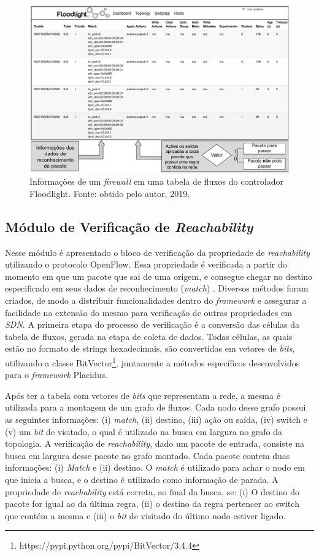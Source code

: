 \documentclass[12pt]{article}
\begin{document}
\begin{figure}[h!]
\centering\includegraphics[width=\columnwidth]{Resources/InfosFloodlight.pdf}
\caption{Informações de um \textit{firewall} em uma tabela de fluxos do controlador Floodlight. Fonte: obtido pelo autor, 2019.}
\label{fig:infosFloodlight}
\end{figure}

\subsection{Módulo de Verificação de \textit{Reachability}} 
Nesse módulo é apresentado o bloco de verificação da propriedade de \textit{reachability} utilizando o protocolo OpenFlow.
Essa propriedade é verificada a partir do momento em que um pacote que sai de uma origem, e consegue chegar no destino especificado em seus dados de reconhecimento (\textit{match})  \cite{1498492}.
Diversos métodos foram criados, de modo a distribuir funcionalidades dentro do \textit{framework} e assegurar a facilidade na extensão do mesmo para verificação de outras propriedades em \textit{SDN}.
A primeira etapa do processo de verificação é a conversão das células da tabela de fluxos, gerada na etapa de coleta de dados. Todas células, as quais estão no formato de strings hexadecimais, são convertidas em vetores de \textit{bits}, utilizando a classe BitVector\footnote{https://pypi.python.org/pypi/BitVector/3.4.4}, juntamente a métodos específicos desenvolvidos para o \textit{framework} Placidus. 

Após ter a tabela com vetores de \textit{bits} que representam a rede, a mesma é utilizada para a montagem de um grafo de fluxos. Cada nodo desse grafo possui as seguintes informações: (i) \textit{match}, (ii) destino, (iii) ação ou saída, (iv) switch e (v) um \textit{bit} de visitado, o qual é utilizado na busca em largura no grafo da topologia. 
A verificação de \textit{reachability}, dado um pacote de entrada, consiste na busca em largura desse pacote no grafo montado.
Cada pacote contem duas informações: (i) \textit{Match} e (ii) destino. 
O \textit{match} é utilizado para achar o nodo em que inicia a busca, e o destino é utilizado como informação de parada. 
A propriedade de \textit{reachability} está correta, ao final da busca, se: (i) O destino do pacote for igual ao da última regra, (ii) o destino da regra pertencer ao switch que contém a mesma e (iii) o \textit{bit} de visitado do último nodo estiver ligado.
\end{document}
